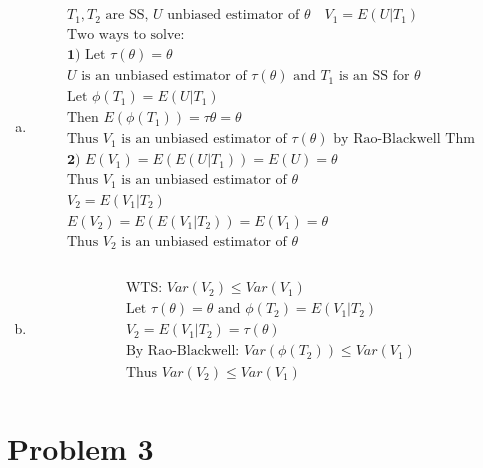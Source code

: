 \documentclass{article}
\newcommand{\ta}{\theta}
\begin{document}
\begin{flushleft}
\begin{enumerate}[(a)]
	\item 
\begin{multline*}\\
T_1,T_2 \text{ are SS, } U \text{ unbiased estimator of } \ta \quad V_1=E(U|T_1)\\
\text{Two ways to solve:}\\
\textbf{1) } \text{Let } \tau(\ta)=\ta\\
U \text{ is an unbiased estimator of } \tau(\ta) \text{ and } T_1 \text{ is an SS for } \ta\\
\text{Let } \phi(T_1)=E(U|T_1)\\
\text{Then } E(\phi(T_1))=\tau{\ta}=\ta\\
\text{Thus }V_1 \text{ is an unbiased estimator of } \tau(\ta) \text{ by Rao-Blackwell Thm}\\
\textbf{2) } E(V_1)=E(E(U|T_1))=E(U)=\theta\\
\text{Thus } V_1 \text{ is an unbiased estimator of } \ta\\
V_2=E(V_1|T_2)\\
E(V_2)=E(E(V_1|T_2))=E(V_1)=\ta\\
\text{Thus } V_2 \text{ is an unbiased estimator of } \ta\\
\end{multline*}

	\item 
\begin{multline*}\\
\text{WTS: } Var(V_2)\leq Var(V_1)\\
\text{Let } \tau(\ta)=\ta \text{ and } \phi(T_2)=E(V_1|T_2)\\
V_2=E(V_1|T_2)=\tau(\ta)\\
\text{By Rao-Blackwell: } Var(\phi(T_2))\leq Var(V_1)\\
\text{Thus } Var(V_2)\leq Var(V_1)\\
\end{multline*}
	
\end{enumerate}
\pagebreak
	\section*{Problem 3}
	

\end{flushleft}
\end{document}
